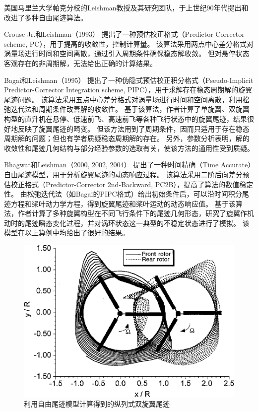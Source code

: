 \documentclass[doctor,openright,twoside,color]{buaathesis}
\begin{document}
美国马里兰大学帕克分校的Leishman教授及其研究团队，于上世纪90年代提出和改进了多种自由尾迹算法。

Crouse Jr.和Leishman（1993）
提出了一种预估校正格式（Predictor-Corrector scheme, PC），用于提高的收敛性，控制计算量。
该算法采用两点中心差分格式对涡量场进行时间和空间离散，通过引入周期条件确保稳态解收敛。
但对悬停状态客观存在的非周期解，无法给出正确的计算结果。

Bagai和Leishman（1995）
提出了一种伪隐式预估校正积分格式（Pseudo-Implicit Predictor-Corrector Integration scheme, PIPC），用于求解存在稳态周期解的旋翼尾迹问题。
该算法采用五点中心差分格式对涡量场进行时间和空间离散，利用松弛迭代法和周期条件改善解的收敛性。
基于该算法，作者计算了单旋翼、双旋翼构型的直升机在悬停、低速前飞、高速前飞等各种飞行状态中的旋翼尾迹，结果很好地反映了旋翼尾迹的畸变。
但该方法用到了周期条件，因而只适用于存在稳态周期解的问题；但也有学者质疑稳态周期解的存在。
另外，参数分析表明，解的收敛性和尾迹几何结构与部分经验参数的选取有关，使该方法的通用性受到质疑。

Bhagwat和Leishman（2000, 2002, 2004）
提出了一种时间精确（Time Accurate）自由尾迹模型，用于分析旋翼尾迹的动态响应过程。
该算法采用二阶后向差分预估校正格式（Predictor-Corrector 2nd-Backward, PC2B），提高了算法的数值稳定性。
由松弛迭代法（如Bagai的PIPC格式）给出初始条件后，可以沿时间积分尾迹方程和桨叶动力学方程，得到旋翼尾迹和桨叶运动的动态响应值。
基于该算法，作者计算了多种旋翼构型在不同飞行条件下的尾迹几何形态，研究了旋翼作机动时的尾迹瞬态变化过程，并对涡环状态这一典型的不稳定状态进行了模拟。
该模型在以上算例中均给出了很好的结果。
\begin{figure}[t!]
    \centering
    \includegraphics[height=0.3\textheight]{figures/free-wake.png}
    \caption{利用自由尾迹模型计算得到的纵列式双旋翼尾迹}\label{free-wake}
\end{figure}
\end{document}
